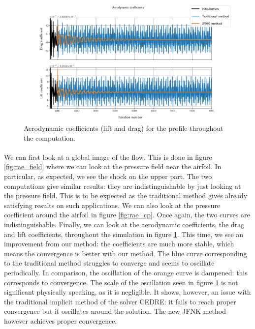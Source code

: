         \begin{figure}
          \centering
          \includegraphics[width=\textwidth]{figures/rae_coefficients.png}
          \caption{Aerodynamic coefficients (lift and drag) for the profile throughout the computation.}
          \label{fig:rae_coefficients}
        \end{figure}

        \paragraph{}
        We can first look at a global image of the flow.
        This is done in figure \ref{fig:rae_field} where we can look at the pressure field near the airfoil.
        In particular, as expected, we see the shock on the upper part.
        The two computations give similar results: they are indistinguishable by just looking at the pressure field.
        This is to be expected as the traditional method gives already satisfying results on such applications.
        We can also look at the pressure coefficient around the airfoil in figure \ref{fig:rae_cp}.
        Once again, the two curves are indistinguishable.
        Finally, we can look at the aerodynamic coefficients, the drag and lift coefficients, throughout the simulation in figure \ref{fig:rae_coefficients}.
        This time, we see an improvement from our method: the coefficients are much more stable, which means the convergence is better with our method.
        The blue curve corresponding to the traditional method struggles to converge and seems to oscillate periodically.
        In comparison, the oscillation of the orange curve is dampened: this corresponds to convergence.
        The scale of the oscillation seen in figure \ref{fig:rae_coefficients} is not significant physically speaking, as it is negligible.
        It shows, however, an issue with the traditional implicit method of the solver CEDRE: it fails to reach proper convergence but it oscillates around the solution.
        The new JFNK method however achieves proper convergence.

